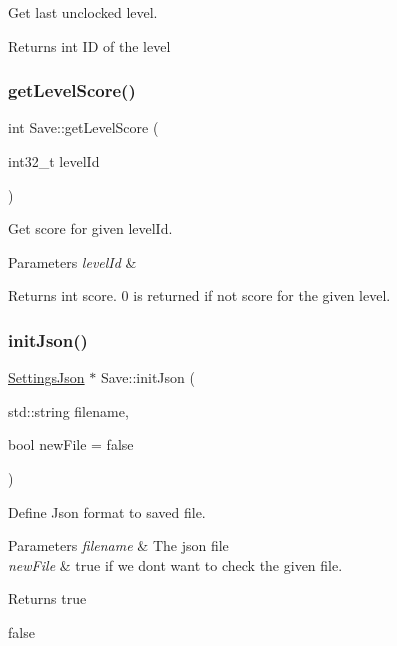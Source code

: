 Get last unclocked level. 

\begin{DoxyReturn}{Returns}
int ID of the level 
\end{DoxyReturn}
\mbox{\label{class_save_a802b6d258310bab2945abd9653360fe5}} 
\subsubsection{\texorpdfstring{get\+Level\+Score()}{getLevelScore()}}
{\footnotesize\ttfamily int Save\+::get\+Level\+Score (\begin{DoxyParamCaption}\item[{int32\+\_\+t}]{level\+Id }\end{DoxyParamCaption})\hspace{0.3cm}{\ttfamily [static]}}



Get score for given level\+Id. 


\begin{DoxyParams}{Parameters}
{\em level\+Id} & \\
\hline
\end{DoxyParams}
\begin{DoxyReturn}{Returns}
int score. 0 is returned if not score for the given level. 
\end{DoxyReturn}
\mbox{\label{class_save_ab3878ea5a5b26b5d1829a98a38d78ffa}} 
\subsubsection{\texorpdfstring{init\+Json()}{initJson()}}
{\footnotesize\ttfamily \hyperlink{class_settings_json}{Settings\+Json} $\ast$ Save\+::init\+Json (\begin{DoxyParamCaption}\item[{std\+::string}]{filename,  }\item[{bool}]{new\+File = {\ttfamily false} }\end{DoxyParamCaption})\hspace{0.3cm}{\ttfamily [static]}}



Define Json format to saved file. 


\begin{DoxyParams}{Parameters}
{\em filename} & The json file \\
\hline
{\em new\+File} & true if we don\textquotesingle{}t want to check the given file. \\
\hline
\end{DoxyParams}
\begin{DoxyReturn}{Returns}
true 

false 
\end{DoxyReturn}
\mbox{\label{class_save_a3427a3913b8a9e724c0a70de39e3799a}} 

